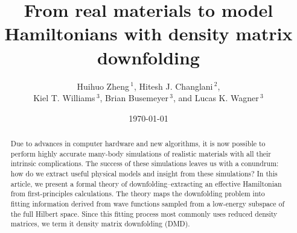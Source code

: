 \documentclass[aps, prb, 11pt]{revtex4-1}
\renewcommand\abstractname{}
\begin{document}

\title[Density matrix downfolding]{From real materials to model Hamiltonians with density matrix downfolding}
\author{Huihuo Zheng\,$^{1}$, Hitesh J. Changlani\,$^{2}$, \\Kiel T. Williams\,$^{3}$, Brian Busemeyer\,$^{3}$, and Lucas K. Wagner\,$^{3}$} %
\date{\today}
\begin{abstract}
Due to advances in computer hardware and new algorithms, it is now possible to perform highly accurate many-body simulations of realistic materials with all their intrinsic complications.
The success of these simulations leaves us with a conundrum: how do we extract useful physical models and insight from these simulations? 
In this article, we present a formal theory of downfolding--extracting an effective Hamiltonian from first-principles calculations. 
The theory maps the downfolding problem into fitting information derived from wave functions sampled from a low-energy subspace of the full Hilbert space. 
Since this fitting process most commonly uses reduced density matrices, we term it density matrix downfolding (DMD).
\end{abstract}
\maketitle
\end{document}

